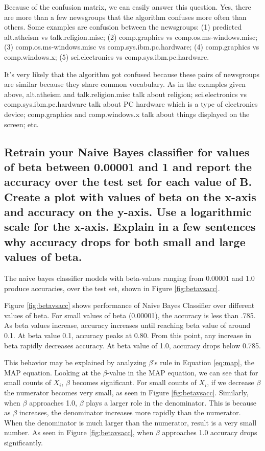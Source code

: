 \documentclass{IEEEtran}
\begin{document}
Because of the confusion matrix, we can easily answer this question. Yes, there are more than a few newsgroups that the algorithm confuses more often than others. Some examples are confusion between the newsgroups: (1) predicted alt.atheism vs talk.religion.misc; (2) comp.graphics vs comp.os.ms-windows.misc; (3) comp.os.ms-windows.misc vs comp.sys.ibm.pc.hardware; (4) comp.graphics vs comp.windows.x; (5) sci.electronics vs comp.sys.ibm.pc.hardware.

It's very likely that the algorithm got confused because these pairs of newsgroups are similar because they share common vocabulary. As in the examples given above, alt.atheism and talk.religion.misc talk about religion; sci.electronics vs comp.sys.ibm.pc.hardware talk about PC hardware which is a type of electronics device; comp.graphics and comp.windows.x talk about things displayed on the screen; etc.


\subsection{Retrain your Naive Bayes classifier for values of beta between 0.00001 and 1 and report the accuracy over the test set for each value of B. Create a plot with values of beta on the x-axis and accuracy on the y-axis. Use a logarithmic scale for the x-axis. Explain in a few sentences why accuracy drops for both small and large values of beta.}
The naive bayes classifier models with beta-values ranging from 0.00001 and 1.0 produce accuracies, over the test set, shown in Figure \ref{fig:betavsacc}.

Figure \ref{fig:betavsacc} shows performance of Naive Bayes Classifier over different values of beta. For small values of beta (0.00001), the accuracy is less than .785. As beta values increase, accuracy increases until reaching beta value of around 0.1. At beta value 0.1, accuracy peaks at 0.80. From this point, any increase in beta rapidly decreases accuracy. At beta value of 1.0, accuracy drops below 0.785.


This behavior may be explained by analyzing $\beta$'s rule in Equation \ref{eq:map}, the MAP equation. Looking at the $\beta$-value in the MAP equation, we can see that for small counts of $X_i$, $\beta$ becomes significant. For small counts of $X_i$, if we decrease $\beta$ the numerator becomes very small, as seen in Figure \ref{fig:betavsacc}. Similarly, when $\beta$ approaches 1.0, $\beta$ plays a larger role in the denominator. This is because as $\beta$ increases, the denominator increases more rapidly than the numerator. When the denominator is much larger than the numerator, result is a very small number. As seen in Figure \ref{fig:betavsacc}, when $\beta$ approaches 1.0 accuracy drops significantly.
\end{document}
